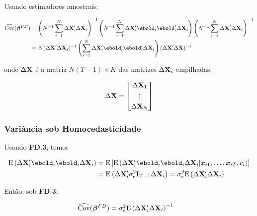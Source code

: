 \documentclass[11pt, oneside, a4paper, article]{article}
\numberwithin{equation}{section}
\begin{document}
\begin{description}
Usando estimadores amostrais:

\begin{center}
\end{center}

\vspace{-1 em}
\begin{align*} 
\widehat{\Cov}( \betavec^{FD} ) &= 
\left( N^{-1} \sum_{i=1}^{N} \Delta \Xmat_{i}' \Delta \Xmat_{i} \right)^{-1}
\left( N^{-1} \sum_{i=1}^{N} \Delta \Xmat_{i}' \ebold_{i}  \ebold_{i}' \Delta \Xmat_{i} \right)
\left( N^{-1} \sum_{i=1}^{N} \Delta \Xmat_{i}' \Delta \Xmat_{i} \right)^{-1}
\\ &=
\red{N}
( \Delta \Xmat' \Delta \Xmat_{i} )^{-1}
\left( \sum_{i=1}^{N} \Delta \Xmat_{i}' \ebold_{i}  \ebold_{i}' \Delta \Xmat_{i} \right)
( \Delta \Xmat' \Delta \Xmat )^{-1} 
\end{align*}

\noindent onde $\Delta \mathbf{X}$ é a matriz $N(T-1) \times K$ das matrizes $\Delta \mathbf{X}_{i}$ empilhadas.

\begin{align*}
\Delta \mathbf{X} = 
\begin{bmatrix}
	\Delta \mathbf{X}_{1} \\	\vdots \\ \Delta \mathbf{X}_{N}
\end{bmatrix}
\end{align*}

\subsubsection{Variância sob Homocedasticidade}
Usando \textbf{FD.3}, temos

\vspace{-1 em}
\begin{align*} 
\E\left( \Delta \Xmat_{i}' \ebold_{i} \ebold_{i} \Delta \Xmat_{i} \right) &= 
\E\left[ \E\left(
\Delta \Xmat_{i}' \ebold_{i} \ebold_{i} \Delta \Xmat_{i} |   
\xvec_{i1}, \dots, \xvec_{iT}, c_{i}
\right) \right]
\\ &=
\E\left( \Delta \Xmat_{i}' \sigma_{e}^2 \Imat_{T-1} \Delta \Xmat_{i} \right)
=
\sigma_{e}^2 \E\left( \Delta \Xmat_{i}'\Delta \Xmat_{i} \right)
\end{align*}

Então, sob \textbf{FD.3}:

\vspace{-1 em}
\begin{align*} 
\widehat{\text{Cov}}( \boldsymbol{\beta}^{FD} ) &= 
\sigma_{e}^2 \text{E}\left( \Delta \mathbf{X}_{i}'\Delta \mathbf{X}_{i} \right)^{-1}
\end{align*}


\end{description}
\end{document}
